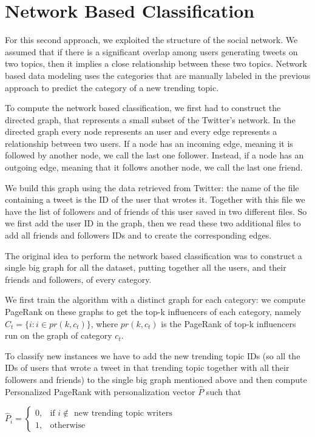 \documentclass[journal,11pt]{vgtc}
\begin{document}
\section{Network Based Classification}
For this second approach, we exploited the structure of the social network. We assumed that if there is a significant overlap among users
generating tweets on two topics, then it implies a close relationship between these two topics.
Network based data modeling uses the categories that are manually labeled in the previous approach to predict
the category of a new trending topic.

To compute the network based classification, we first had to construct the directed graph, that represents a small
subset of the Twitter's network.
In the directed graph every node represents an user and every edge represents a relationship between two users.
If a node has an incoming edge, meaning it is followed by another node, we call the last one follower. Instead, if a node has an
outgoing edge, meaning that it follows another node, we call the last one friend.

We build this graph using the data retrieved from Twitter: the name of the file containing a tweet is the ID of the user that wrotes it.
Together with this file we have the list of followers and of friends of this user saved in two different files.
So we first add the user ID in the graph, then we read these two additional files to add all friends and followers IDs and to
create the corresponding edges.

The original idea to perform the network based classification was to construct a single big graph for all the dataset, putting
together all the users, and their friends and followers, of every category.

We first train the algorithm with a distinct graph for each category: we compute PageRank on these graphs to get
the top-k influencers of each category, namely $C_t=\{i : i \in pr(k, c_t)\}$, where $pr(k, c_t)$ is the PageRank of
top-k influencers run on the graph of category $c_t$.

To classify new instances we have to add the new trending topic IDs (so all the IDs of users that wrote a tweet in that
trending topic together with all their followers and friends) to the single big graph mentioned above and then compute
Personalized PageRank with personalization vector $\hat{P}$ such that

\bigskip

\begin{center}
$
\hat{P}_i=
\begin{cases}
  0, & \mbox{if } i \not\in \mbox{ new trending topic writers} \\
  1, & \mbox{otherwise }
\end{cases}
$
\end{center}
\end{document}

